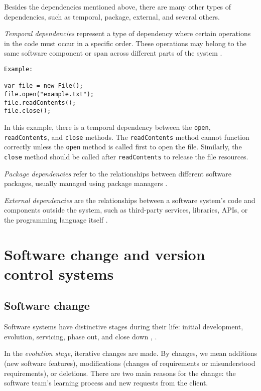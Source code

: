 \hspace{4em} Besides the dependencies mentioned above, there are many other types of dependencies, such as temporal, package, external, and several others.

\textit{Temporal dependencies} represent a type of dependency where certain operations in the code must occur in a specific order. These operations may belong to the same software component or span across different parts of the system \cite{work-dep}.

\begin{verbatim}
Example:

var file = new File();
file.open("example.txt");
file.readContents();
file.close();
\end{verbatim}

In this example, there is a temporal dependency between the \texttt{open}, \texttt{readContents}, and \texttt{close} methods. The \texttt{readContents} method cannot function correctly unless the \texttt{open} method is called first to open the file. Similarly, the \texttt{close} method should be called after \texttt{readContents} to release the file resources.


\textit{Package dependencies} refer to the relationships between different software packages, usually managed using package managers \cite{dep-package}.

\textit{External dependencies} are the relationships between a software system's code and components outside the system, such as third-party services, libraries, APIs, or the programming language itself \cite{dep-external}.






\section{Software change and version control systems}

\subsection{Software change}
\label{change}

\hspace{4em} Software systems have distinctive stages during their life: initial development, evolution, servicing, phase out, and close down \cite{Software-life-cycle}, \cite{model-bennett}.

In the \textit{evolution stage}, iterative changes are made. By changes, we mean additions (new software features), modifications (changes of requirements or misunderstood requirements), or deletions. There are two main reasons for the change: the software team's learning process and new requests from the client.

